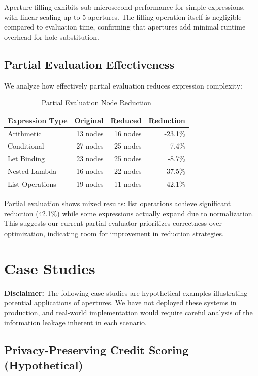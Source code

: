 \documentclass[12pt]{article}
\begin{document}
Aperture filling exhibits sub-microsecond performance for simple expressions, with linear scaling up to 5 apertures. The filling operation itself is negligible compared to evaluation time, confirming that apertures add minimal runtime overhead for hole substitution.

\subsection{Partial Evaluation Effectiveness}

We analyze how effectively partial evaluation reduces expression complexity:

\begin{table}[h]
\centering
\caption{Partial Evaluation Node Reduction}
\begin{tabular}{lrrr}
\toprule
\textbf{Expression Type} & \textbf{Original} & \textbf{Reduced} & \textbf{Reduction} \\
\midrule
Arithmetic & 13 nodes & 16 nodes & -23.1\% \\
Conditional & 27 nodes & 25 nodes & 7.4\% \\
Let Binding & 23 nodes & 25 nodes & -8.7\% \\
Nested Lambda & 16 nodes & 22 nodes & -37.5\% \\
List Operations & 19 nodes & 11 nodes & 42.1\% \\
\bottomrule
\end{tabular}
\end{table}

Partial evaluation shows mixed results: list operations achieve significant reduction (42.1\%) while some expressions actually expand due to normalization. This suggests our current partial evaluator prioritizes correctness over optimization, indicating room for improvement in reduction strategies.

\section{Case Studies}

\textbf{Disclaimer:} The following case studies are hypothetical examples illustrating potential applications of apertures. We have not deployed these systems in production, and real-world implementation would require careful analysis of the information leakage inherent in each scenario.

\subsection{Privacy-Preserving Credit Scoring (Hypothetical)}
\end{document}
